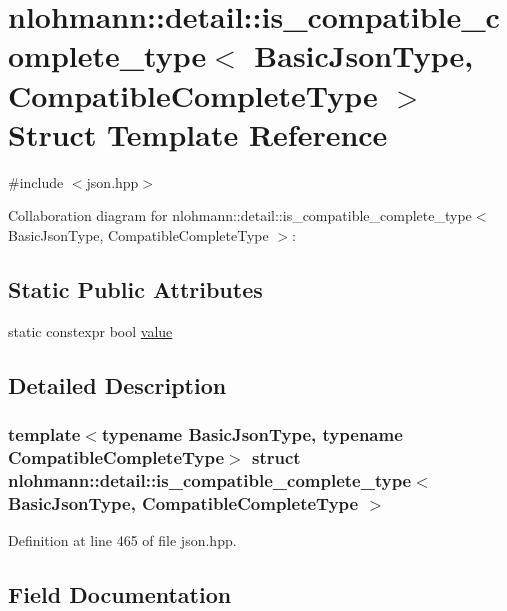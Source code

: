 \hypertarget{structnlohmann_1_1detail_1_1is__compatible__complete__type}{}\section{nlohmann\+:\+:detail\+:\+:is\+\_\+compatible\+\_\+complete\+\_\+type$<$ Basic\+Json\+Type, Compatible\+Complete\+Type $>$ Struct Template Reference}
\label{structnlohmann_1_1detail_1_1is__compatible__complete__type}


{\ttfamily \#include $<$json.\+hpp$>$}



Collaboration diagram for nlohmann\+:\+:detail\+:\+:is\+\_\+compatible\+\_\+complete\+\_\+type$<$ Basic\+Json\+Type, Compatible\+Complete\+Type $>$\+:
\subsection*{Static Public Attributes}
\begin{DoxyCompactItemize}
\item 
static constexpr bool \hyperlink{structnlohmann_1_1detail_1_1is__compatible__complete__type_a34bed4700a302b79feb045b6bdbda9aa}{value}
\end{DoxyCompactItemize}


\subsection{Detailed Description}
\subsubsection*{template$<$typename Basic\+Json\+Type, typename Compatible\+Complete\+Type$>$\newline
struct nlohmann\+::detail\+::is\+\_\+compatible\+\_\+complete\+\_\+type$<$ Basic\+Json\+Type, Compatible\+Complete\+Type $>$}



Definition at line 465 of file json.\+hpp.



\subsection{Field Documentation}
\mbox{\label{structnlohmann_1_1detail_1_1is__compatible__complete__type_a34bed4700a302b79feb045b6bdbda9aa}} 
